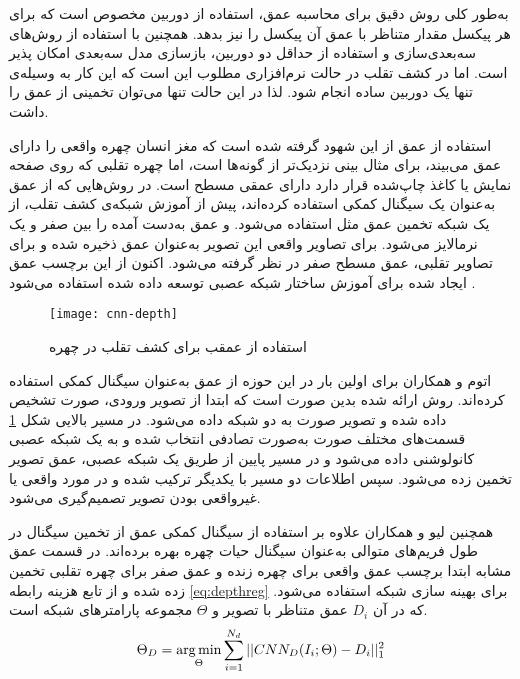 به‌طور کلی روش دقیق برای محاسبه عمق، استفاده از دوربین مخصوص است که برای هر پیکسل مقدار متناظر با عمق آن پیکسل را نیز بدهد. همچنین با استفاده از روش‌های سه‌بعدی‌سازی و استفاده از حداقل دو دوربین، بازسازی مدل سه‌بعدی امکان پذیر است. اما در کشف تقلب در حالت نرم‌افزاری مطلوب این است که این کار به وسیله‌ی تنها یک دوربین ساده انجام شود. لذا در این حالت تنها می‌توان تخمینی از عمق را داشت.


استفاده از عمق از این شهود گرفته شده است که مغز انسان چهره واقعی را دارای عمق می‌بیند، برای مثال بینی نزدیک‌تر از گونه‌ها است، اما چهره تقلبی که روی صفحه نمایش یا کاغذ چاپ‌شده قرار دارد دارای عمقی مسطح است. در روش‌هایی که از عمق به‌عنوان یک سیگنال کمکی استفاده کرده‌اند، پیش از آموزش شبکه‌ی کشف تقلب، از یک شبکه تخمین عمق مثل 
 \cite{feng2018joint} 
استفاده می‌شود. و عمق به‌دست آمده را بین صفر و یک نرمالایز می‌شود. برای تصاویر واقعی این تصویر به‌عنوان عمق ذخیره شده و برای تصاویر تقلبی، عمق مسطح صفر در نظر گرفته می‌شود. اکنون از این برچسب عمق ایجاد شده برای آموزش ساختار شبکه عصبی توسعه داده شده استفاده می‌شود
\cite{atoum2017face,yu2020searching,shao2019multi,liu2018learning,wang2020deep,wang2018exploiting}.
\begin{figure}[h]
	\centerline{\texttt{[image: cnn-depth]}}
	\caption{استفاده از عمقب برای کشف تقلب در چهره  \cite{atoum2017face}}
	\label{fig:cnn-depth}
\end{figure}

اتوم و همکاران
\cite{atoum2017face}
  برای اولین بار در این حوزه از عمق به‌عنوان سیگنال کمکی استفاده کرده‌اند. روش ارائه شده بدین صورت است که ابتدا از تصویر ورودی، صورت تشخیص داده شده و تصویر صورت به دو شبکه داده می‌شود. در مسیر بالایی شکل
\ref{fig:cnn-depth}
   قسمت‌های مختلف صورت به‌صورت تصادفی انتخاب شده و به یک شبکه عصبی کانولوشنی داده می‌شود و در مسیر پایین از طریق یک شبکه عصبی، عمق تصویر تخمین زده می‌شود. سپس اطلاعات دو مسیر با یکدیگر ترکیب شده و در مورد واقعی یا غیرواقعی بودن تصویر تصمیم‌گیری می‌شود.
   
   همچنین لیو و همکاران
\cite{liu2018learning}
   علاوه بر استفاده از سیگنال کمکی عمق از تخمین سیگنال  در طول فریم‌های متوالی به‌عنوان سیگنال حیات چهره بهره برده‌اند. در قسمت عمق مشابه
\cite{atoum2017face}
   ابتدا برچسب عمق واقعی برای چهره زنده و عمق صفر برای چهره تقلبی تخمین زده شده و از تابع هزینه رابطه
\ref{eq:depthreg}
   برای بهینه سازی شبکه استفاده می‌شود. که در آن 
$D_i$
 عمق متناظر با تصویر و 
$\Theta$
مجموعه پارامتر‌های شبکه است.
\begin{equation}\label{eq:depthreg}
	\Theta_D = \operatorname*{arg\,min}_\Theta{\sum_{i=1}^{N_d}||CNN_D(I_i;\Theta)-D_i||^2_1} 
\end{equation}

